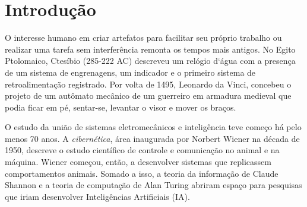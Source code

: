 \chapter{Introdução}
\label{chap:Intro}


\par O interesse humano em criar artefatos para facilitar seu próprio trabalho ou realizar uma tarefa sem interferência remonta os tempos mais antigos. No Egito Ptolomaico, Ctesíbio (285-222 AC) descreveu um relógio d`água com a presença de um sistema de engrenagens, um indicador e o primeiro sistema de retroalimentação registrado. Por volta de 1495, Leonardo da Vinci, concebeu o projeto de um autômato mecânico de um guerreiro em armadura medieval que podia ficar em pé, sentar-se, levantar o visor e mover os braços. \cite{guarnieri2010} 
\par O estudo da união de sistemas eletromecânicos e inteligência teve começo há pelo menos 70 anos. A \textit{cibernética}, área inaugurada por Norbert Wiener na década de 1950, descreve o estudo científico de controle e comunicação no animal e na máquina. Wiener começou, então, a desenvolver sistemas que replicassem comportamentos animais.\cite{wiener1950} Somado a isso, a teoria da informação de Claude Shannon e a teoria de computação de Alan Turing abriram espaço para pesquisas que iriam desenvolver Inteligências Artificiais (IA). \cite{pamela2004} 

